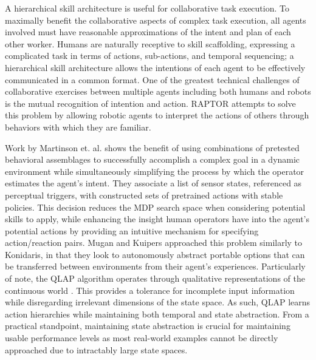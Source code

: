\documentclass[letterpaper]{article}
\begin{document}
  A hierarchical skill architecture is useful for collaborative task execution. To maximally benefit the collaborative aspects of complex task execution, all agents involved must have reasonable approximations of the intent and plan of each other worker. Humans are naturally receptive to skill scaffolding, expressing a complicated task in terms of actions, sub-actions, and temporal sequencing; a hierarchical skill architecture allows the intentions of each agent to be effectively communicated in a common format. One of the greatest technical challenges of collaborative exercises between multiple agents including both humans and robots is the mutual recognition of intention and action. RAPTOR attempts to solve this problem by allowing robotic agents to interpret the actions of others through behaviors with which they are familiar.
 
  Work by Martinson et. al.  shows the benefit of using combinations of pretested behavioral assemblages to successfully accomplish a complex goal in a dynamic environment while simultaneously simplifying the process by which the operator estimates the agent's intent. They associate a list of sensor states, referenced as perceptual triggers, with constructed sets of pretrained actions with stable policies. This decision reduces the MDP search space when considering potential skills to apply, while enhancing the insight human operators have into the agent's potential actions by providing an intuitive mechanism for specifying action/reaction pairs. Mugan and Kuipers  approached this problem similarly to Konidaris, in that they look to autonomously abstract portable options that can be transferred between environments from their agent's experiences. Particularly of note, the QLAP algorithm operates through qualitative representations of the continuous world \cite{AutoHierarchyLearning}. This provides a tolerance for incomplete input information while disregarding irrelevant dimensions of the state space. As such, QLAP learns action hierarchies while maintaining both temporal and state abstraction. From a practical standpoint, maintaining state abstraction is crucial for maintaining usable performance levels as most real-world examples cannot be directly approached due to intractably large state spaces.
\end{document}
